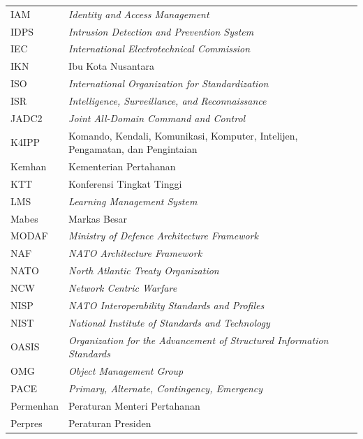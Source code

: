 \begin{longtable}{@{} l >{\raggedright\arraybackslash}p{7.2cm} c @{}}
IAM & \textit{Identity and Access Management} & \pageref{sk:IAM} \\
IDPS & \textit{Intrusion Detection and Prevention System} & \pageref{sk:IDPS} \\
IEC & \textit{International Electrotechnical Commission} & \pageref{sk:IEC} \\
IKN & Ibu Kota Nusantara & \pageref{sk:IKN} \\
ISO & \textit{International Organization for Standardization} & \pageref{sk:ISO} \\
ISR & \textit{Intelligence, Surveillance, and Reconnaissance} & \pageref{sk:ISR} \\
JADC2 & \textit{Joint All-Domain Command and Control} & \pageref{sk:JADC2} \\
K4IPP & Komando, Kendali, Komunikasi, Komputer, Intelijen, Pengamatan, dan Pengintaian & \pageref{sk:K4IPP} \\
Kemhan & Kementerian Pertahanan & \pageref{sk:Kemhan} \\
KTT & Konferensi Tingkat Tinggi & \pageref{sk:KTT} \\
LMS & \textit{Learning Management System} & \pageref{sk:LMS} \\
Mabes & Markas Besar & \pageref{sk:Mabes} \\
MODAF & \textit{Ministry of Defence Architecture Framework} & \pageref{sk:MODAF} \\
NAF & \textit{NATO Architecture Framework} & \pageref{sk:NAF} \\
NATO & \textit{North Atlantic Treaty Organization} & \pageref{sk:NATO} \\
NCW & \textit{Network Centric Warfare} & \pageref{sk:NCW} \\
NISP & \textit{NATO Interoperability Standards and Profiles} & \pageref{sk:NISP} \\
NIST & \textit{National Institute of Standards and Technology} & \pageref{sk:NIST} \\
OASIS & \textit{Organization for the Advancement of Structured Information Standards} & \pageref{sk:OASIS} \\
OMG & \textit{Object Management Group} & \pageref{sk:OMG} \\
PACE & \textit{Primary, Alternate, Contingency, Emergency} & \pageref{sk:PACE} \\
Permenhan & Peraturan Menteri Pertahanan & \pageref{sk:Permenhan} \\
Perpres & Peraturan Presiden & \pageref{sk:Perpres} \\

\end{longtable}
